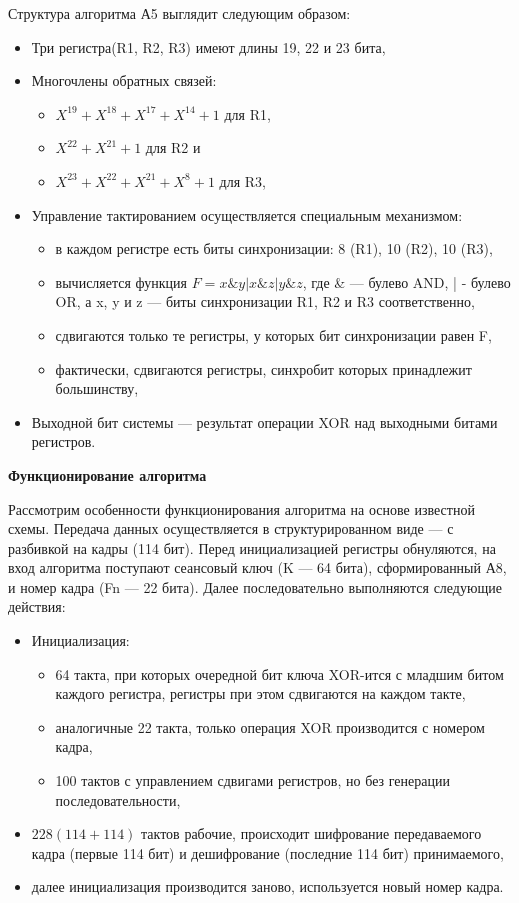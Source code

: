 \documentclass[a4paper]{report}
\begin{document}
Структура алгоритма А5 выглядит следующим образом:
\begin{itemize}
\item Три регистра(R1, R2, R3) имеют длины 19, 22 и 23 бита,
\item Многочлены обратных связей:
\begin{itemize}
\item $X^{19} + X^{18} + X^{17} + X^{14} + 1$ для R1,
\item $X^{22} + X^{21} + 1$ для R2 и
\item $X^{23} + X^{22} + X^{21} + X^8 + 1$ для R3,
\end{itemize}
\item Управление тактированием осуществляется специальным механизмом:
\begin{itemize}
\item в каждом регистре есть биты синхронизации: 8 (R1), 10 (R2), 10 (R3),
\item вычисляется функция $F = x\&y|x\&z|y\&z$, где \& — булево AND, | - булево OR, а x, y и z — биты синхронизации R1, R2 и R3 соответственно,
\item сдвигаются только те регистры, у которых бит синхронизации равен F,
\item фактически, сдвигаются регистры, синхробит которых принадлежит большинству,
\end{itemize}
\item Выходной бит системы — результат операции XOR над выходными битами регистров.
\end{itemize}

\textbf{Функционирование алгоритма}

Рассмотрим особенности функционирования алгоритма на основе известной схемы. Передача данных осуществляется в структурированном виде — с разбивкой на кадры (114 бит). Перед инициализацией регистры обнуляются, на вход алгоритма поступают сеансовый ключ (K — 64 бита), сформированный А8, и номер кадра (Fn — 22 бита). Далее последовательно выполняются следующие действия:

\begin{itemize}
\item Инициализация:
\begin{itemize}
\item 64 такта, при которых очередной бит ключа XOR-ится с младшим битом каждого регистра, регистры при этом сдвигаются на каждом такте,
\item аналогичные 22 такта, только операция XOR производится с номером кадра,
\item 100 тактов с управлением сдвигами регистров, но без генерации последовательности,
\end{itemize}
\item $228 (114 + 114)$ тактов рабочие, происходит шифрование передаваемого кадра (первые 114 бит) и дешифрование (последние 114 бит) принимаемого,
\item далее инициализация производится заново, используется новый номер кадра.
\end{itemize}
\end{document}
